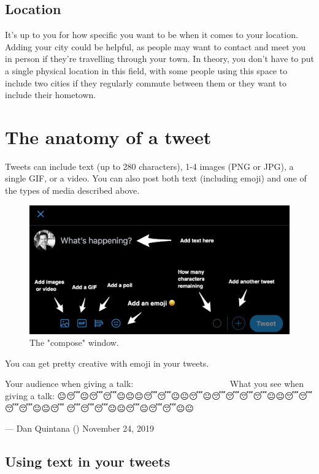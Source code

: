 \documentclass[]{book}
\begin{document}
\hypertarget{location}{%
\subsection{Location}\label{location}}

It's up to you for how specific you want to be when it comes to your location. Adding your city could be helpful, as people may want to contact and meet you in person if they're travelling through your town. In theory, you don't have to put a single physical location in this field, with some people using this space to include two cities if they regularly commute between them or they want to include their hometown.

\hypertarget{the-anatomy-of-a-tweet}{%
\section{The anatomy of a tweet}\label{the-anatomy-of-a-tweet}}

Tweets can include text (up to 280 characters), 1-4 images (PNG or JPG), a single GIF, or a video. You can also post both text (including emoji) and one of the types of media described above.

\begin{figure}

\includegraphics[width=0.8\linewidth]{images/compose} \hfill{}

\caption{The "compose" window.}\label{fig:unnamed-chunk-2}
\end{figure}

You can get pretty creative with emoji in your tweets.

Your audience when giving a talk: 🙂🙂🙂😀🧐😀😀😏😀🤓😃😀😀😊😀😊🙂🙂😀🙂😀😴🙂😀🙂😀🙂😐🙂🙂😀🙂🙂🙂😀🙂😀🙂😀What you see when giving a talk: 😐😴😐😴😴😐😐😐😴😴😐😐😴😐😴😴😴😴😐😐😴😴😴😴😐😐😴🤔😴😴😴😐😐😴😐😴😴😐😐

--- Dan Quintana (\citet{dsquintana}) November 24, 2019

\hypertarget{using-text-in-your-tweets}{%
\subsection{Using text in your tweets}\label{using-text-in-your-tweets}}
\end{document}
